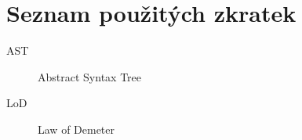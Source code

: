 \chapter{Seznam použitých zkratek}

\begin{description}
\item[AST] Abstract Syntax Tree
\item[LoD] Law of Demeter
\end{description}
